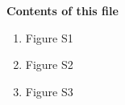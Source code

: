 \documentclass[draft,grl]{agutexSI2019}
\begin{document}
\begin{article}



\noindent\textbf{Contents of this file}
\begin{enumerate}
\item Figure S1
\item Figure S2
\item Figure S3
\end{enumerate}





%
%



% 
%
%
%
%

%  




%
%
%
%
%

%
%
\end{article}
\end{document}
